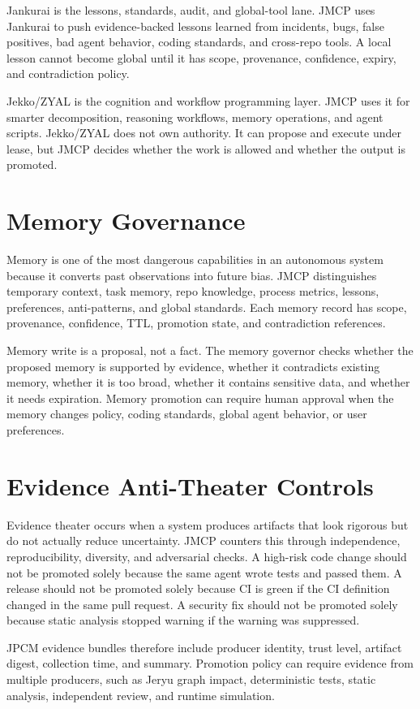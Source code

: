 \documentclass[10pt,journal,onecolumn]{IEEEtran}
\begin{document}
Jankurai is the lessons, standards, audit, and global-tool lane. JMCP uses Jankurai to push evidence-backed lessons learned from incidents, bugs, false positives, bad agent behavior, coding standards, and cross-repo tools. A local lesson cannot become global until it has scope, provenance, confidence, expiry, and contradiction policy.

Jekko/ZYAL is the cognition and workflow programming layer. JMCP uses it for smarter decomposition, reasoning workflows, memory operations, and agent scripts. Jekko/ZYAL does not own authority. It can propose and execute under lease, but JMCP decides whether the work is allowed and whether the output is promoted.

\section{Memory Governance}
Memory is one of the most dangerous capabilities in an autonomous system because it converts past observations into future bias. JMCP distinguishes temporary context, task memory, repo knowledge, process metrics, lessons, preferences, anti-patterns, and global standards. Each memory record has scope, provenance, confidence, TTL, promotion state, and contradiction references.

Memory write is a proposal, not a fact. The memory governor checks whether the proposed memory is supported by evidence, whether it contradicts existing memory, whether it is too broad, whether it contains sensitive data, and whether it needs expiration. Memory promotion can require human approval when the memory changes policy, coding standards, global agent behavior, or user preferences.

\section{Evidence Anti-Theater Controls}
Evidence theater occurs when a system produces artifacts that look rigorous but do not actually reduce uncertainty. JMCP counters this through independence, reproducibility, diversity, and adversarial checks. A high-risk code change should not be promoted solely because the same agent wrote tests and passed them. A release should not be promoted solely because CI is green if the CI definition changed in the same pull request. A security fix should not be promoted solely because static analysis stopped warning if the warning was suppressed.

JPCM evidence bundles therefore include producer identity, trust level, artifact digest, collection time, and summary. Promotion policy can require evidence from multiple producers, such as Jeryu graph impact, deterministic tests, static analysis, independent review, and runtime simulation.
\end{document}
